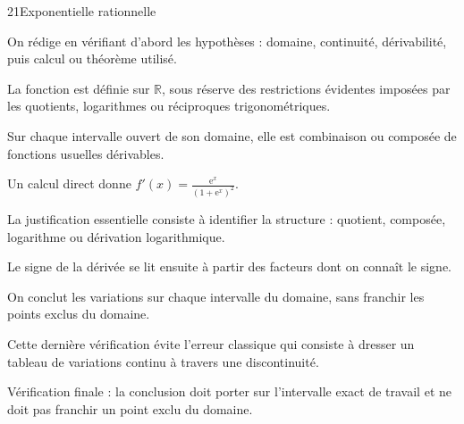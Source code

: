 \documentclass[11pt,a4paper]{article}
\newcommand{\R}{\mathbb{R}}
\newcommand{\e}{\mathrm{e}}
\begin{document}
\begin{corrbox}{21}{Exponentielle rationnelle}

\begin{methodebox}
On rédige en vérifiant d'abord les hypothèses : domaine, continuité, dérivabilité, puis calcul ou théorème utilisé.
\end{methodebox}

La fonction est définie sur $\R$, sous réserve des restrictions évidentes imposées par les quotients, logarithmes ou réciproques trigonométriques.


Sur chaque intervalle ouvert de son domaine, elle est combinaison ou composée de fonctions usuelles dérivables.


Un calcul direct donne $f'(x)=\frac{\e^x}{(1+\e^x)^2}$.


La justification essentielle consiste à identifier la structure : quotient, composée, logarithme ou dérivation logarithmique.


Le signe de la dérivée se lit ensuite à partir des facteurs dont on connaît le signe.


On conclut les variations sur chaque intervalle du domaine, sans franchir les points exclus du domaine.


Cette dernière vérification évite l'erreur classique qui consiste à dresser un tableau de variations continu à travers une discontinuité.


\begin{attentionbox}
Vérification finale : la conclusion doit porter sur l'intervalle exact de travail et ne doit pas franchir un point exclu du domaine.
\end{attentionbox}

\end{corrbox}
\end{document}
